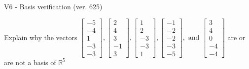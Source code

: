 \begin{exercise}
  \begin{exerciseTitle}V6 - Basis verification (ver. 625)\end{exerciseTitle}
  \begin{exerciseStatement}
    Explain why the vectors \(\left[\begin{array}{r}
-5 \\
-4 \\
1 \\
-3 \\
-3
\end{array}\right] , \left[\begin{array}{r}
2 \\
4 \\
3 \\
-1 \\
3
\end{array}\right] , \left[\begin{array}{r}
1 \\
2 \\
-3 \\
-3 \\
1
\end{array}\right] , \left[\begin{array}{r}
-1 \\
-2 \\
-2 \\
-3 \\
-5
\end{array}\right] , \text{ and } \left[\begin{array}{r}
3 \\
4 \\
0 \\
-4 \\
-4
\end{array}\right]\) are or are not a basis of \(\mathbb{R}^5\)	



\end{exerciseStatement}
\end{exercise}

